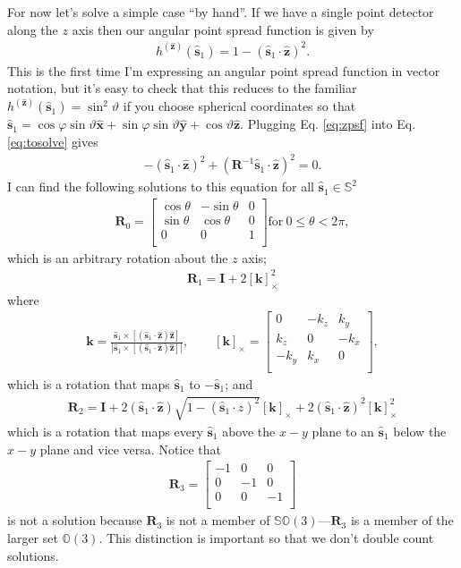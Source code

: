 \documentclass[11pt]{article}
\providecommand{\mb}[1]{\mathbf{#1}}
\providecommand{\so}[1]{\mathbf{\hat{s}}_1}
\providecommand{\mh}[1]{\mathbf{\hat{#1}}}
\begin{document}
For now let's solve a simple case ``by hand''. If we have a single point
detector along the $z$ axis then our angular point spread function is given by
\begin{align}
  h^{(\mh{z})}(\so{}) = 1 - (\so{}\cdot\mh{z})^2. \label{eq:zpsf}
\end{align}
This is the first time I'm expressing an angular point spread function in vector
notation, but it's easy to check that this reduces to the familiar $h^{(\mh{z})}(\so{}) = \sin^2\vartheta$ if you choose spherical coordinates so that $\so{} = \cos\varphi\sin\vartheta\mh{x} + \sin\varphi\sin\vartheta\mh{y} + \cos\vartheta\mh{z}$. Plugging Eq. \ref{eq:zpsf} into Eq. \ref{eq:tosolve} gives
\begin{align}
  -(\so{}\cdot\mh{z})^2 + (\mb{R}^{-1}\so{}\cdot\mh{z})^2 = 0.
\end{align}
I can find the following solutions to this equation for all $\so{} \in \mathbb{S}^2$
\begin{align}
  \mb{R}_0 =
  \begin{bmatrix}
    \cos\theta& -\sin\theta & 0\\
    \sin\theta& \cos\theta & 0\\
    0&0&1\\
  \end{bmatrix} \text{for}\ 0 \leq \theta < 2\pi,
\end{align}
which is an arbitrary rotation about the $z$ axis;
\begin{align}
  \mb{R}_1 = \mb{I} + 2 \left[\mb{k}\right]_{\times}^2
\end{align}
where
\begin{align}
  \mb{k} = \frac{\so{}\times[(\so{}\cdot\mh{z})\mh{z}]}{|\so{}\times[(\so{}\cdot\mh{z})\mh{z}]|}, \qquad  \left[\mb{k}\right]_{\times} =
  \begin{bmatrix}
    0& -k_z& k_y\\
    k_z& 0 & -k_x\\
    -k_y& k_x& 0 \\
  \end{bmatrix},
\end{align}
which is a rotation that maps $\so{}$ to $-\so{}$; and
\begin{align}
  \mb{R}_2 = \mb{I} + 2(\so{}\cdot\mh{z})\sqrt{1 - (\so{}\cdot{z})^2}\left[\mb{k}\right]_{\times} + 2(\so{}\cdot\mh{z})^2\left[\mb{k}\right]_{\times}^2
\end{align}
which is a rotation that maps every $\so{}$ above the $x-y$ plane to an $\so{}$
below the $x-y$ plane and vice versa. Notice that
\begin{align}
  \mb{R}_3 =
  \begin{bmatrix}
    -1&0&0\\
    0&-1&0\\
    0&0&-1\\    
  \end{bmatrix}
\end{align}
is not a solution because $\mb{R}_3$ is not a member of $\mathbb{SO}(3)$---$\mb{R}_3$ is a member of the larger set $\mathbb{O}(3)$. This distinction is important
so that we don't double count solutions.
\end{document}
